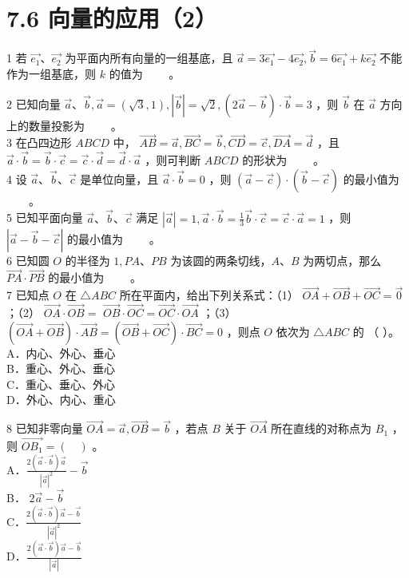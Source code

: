 \documentclass[10pt]{article}
\begin{document}
\section*{7.6 向量的应用（2）}
1 若 \(\overrightarrow{e_{1}} 、 \overrightarrow{e_{2}}\) 为平面内所有向量的一组基底，且 \(\vec{a}=3 \overrightarrow{e_{1}}-4 \overrightarrow{e_{2}}, \vec{b}=6 \overrightarrow{e_{1}}+k \overrightarrow{e_{2}}\) 不能作为一组基底，则 \(k\) 的值为 \(\qquad\)。

2 已知向量 \(\vec{a} 、 \vec{b}, \vec{a}=(\sqrt{3}, 1),|\vec{b}|=\sqrt{2},(2 \vec{a}-\vec{b}) \cdot \vec{b}=3\) ，则 \(\vec{b}\) 在 \(\vec{a}\) 方向上的数量投影为 \(\qquad\)。\\
3 在凸四边形 \(A B C D\) 中， \(\overrightarrow{A B}=\vec{a}, \overrightarrow{B C}=\vec{b}, \overrightarrow{C D}=\vec{c}, \overrightarrow{D A}=\vec{d}\) ，且 \(\vec{a} \cdot \vec{b}=\vec{b} \cdot \vec{c}=\vec{c} \cdot \vec{d}=\vec{d} \cdot \vec{a}\) ，则可判断 \(A B C D\) 的形状为 \(\qquad\)。\\
4 设 \(\vec{a} 、 \vec{b} 、 \vec{c}\) 是单位向量，且 \(\vec{a} \cdot \vec{b}=0\) ，则 \((\vec{a}-\vec{c}) \cdot(\vec{b}-\vec{c})\) 的最小值为 \(\qquad\)。\\
5 已知平面向量 \(\vec{a} 、 \vec{b} 、 \vec{c}\) 满足 \(|\vec{a}|=1, \vec{a} \cdot \vec{b}=\frac{1}{3} \vec{b} \cdot \vec{c}=\vec{c} \cdot \vec{a}=1\) ，则 \(|\vec{a}-\vec{b}-\vec{c}|\) 的最小值为 \(\qquad\)。\\
6 已知圆 \(O\) 的半径为 \(1, P A 、 P B\) 为该圆的两条切线，\(A 、 B\) 为两切点，那么 \(\overrightarrow{P A} \cdot \overrightarrow{P B}\) 的最小值为 \(\qquad\)。\\
7 已知点 \(O\) 在 \(\triangle A B C\) 所在平面内，给出下列关系式：（1） \(\overrightarrow{O A}+\overrightarrow{O B}+\overrightarrow{O C}=\overrightarrow{0}\) ；（2） \(\overrightarrow{O A} \cdot \overrightarrow{O B}=\) \(\overrightarrow{O B} \cdot \overrightarrow{O C}=\overrightarrow{O C} \cdot \overrightarrow{O A}\) ；（3）\((\overrightarrow{O A}+\overrightarrow{O B}) \cdot \overrightarrow{A B}=(\overrightarrow{O B}+\overrightarrow{O C}) \cdot \overrightarrow{B C}=0\) ，则点 \(O\) 依次为 \(\triangle A B C\) 的 （ ）。\\
A．内心、外心、垂心\\
B．重心、外心、垂心\\
C．重心、垂心、外心\\
D．外心、内心、重心

8 已知非零向量 \(\overrightarrow{O A}=\vec{a}, \overrightarrow{O B}=\vec{b}\) ，若点 \(B\) 关于 \(\overrightarrow{O A}\) 所在直线的对称点为 \(B_{1}\) ，则 \(\overrightarrow{O B_{1}}=(\quad)\) 。\\
A．\(\frac{2(\vec{a} \cdot \vec{b}) \vec{a}}{|\vec{a}|^{2}}-\vec{b}\)\\
B． \(2 \vec{a}-\vec{b}\)\\
C．\(\frac{2(\vec{a} \cdot \vec{b}) \vec{a}-\vec{b}}{|\vec{a}|^{2}}\)\\
D．\(\frac{2(\vec{a} \cdot \vec{b}) \vec{a}-\vec{b}}{|\vec{a}|}\)
\end{document}
